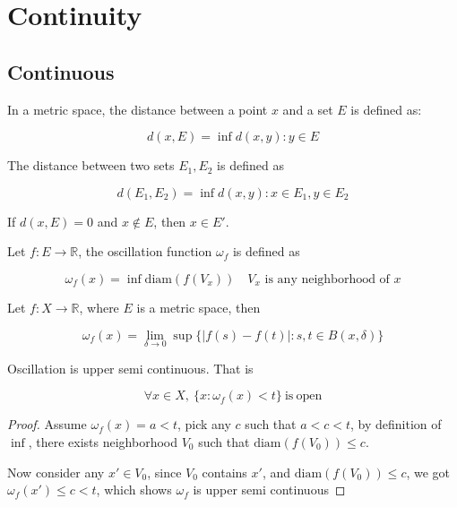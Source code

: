 \section{Continuity}

\subsection{Continuous}

\begin{definition}[Distance]
   In a metric space, the distance between a point $x$ and a set $E$ is defined as:
   
   \[
    d(x, E) = \inf {d(x,y): y \in E}
   \]

   The distance between two sets $E_1, E_2$ is defined as

   \[
    d(E_1, E_2) = \inf { d(x,y): x \in E_1, y \in E_2}
   \]
\end{definition}

\begin{corollary}
    If $d(x, E) = 0$ and $x \notin E$, then $x \in E'$.
\end{corollary}


\begin{definition}[Oscillation]
    Let $f: E \to \mathbb{R}$, the oscillation function $\omega_f$ is defined as

    \[
        \omega_f(x) = \inf \mathrm{diam}(f(V_x)) \quad V_x \text{ is any neighborhood of } x
    \]
\end{definition}

\begin{corollary}
    Let $f: X \to \mathbb{R}$, where $E$ is a metric space, then


    \[
        \omega_f(x) = \lim_{\delta \to 0} \sup \{ \left| f(s) - f(t) \right|: s,t \in B(x, \delta) \}
    \]
\end{corollary}

\begin{thm}
    Oscillation is upper semi continuous. That is

    \[
        \forall x \in X,\: \{x: \omega_f (x) < t \} \mathrm{\ is\ open}
    \]
\end{thm}

\begin{proof}
    Assume $\omega_f(x) = a < t$, pick any $c$ such that $a < c < t$, by definition of $\inf$, 
    there exists neighborhood $V_0$ such that $\mathrm{diam}(f(V_0)) \le c$.

    Now consider any $x' \in V_0$, since $V_0$ contains $x'$, and $\mathrm{diam}(f(V_0)) \le c$,
    we got $\omega_f(x') \le c < t$, which shows $\omega_f$ is upper semi continuous
\end{proof}